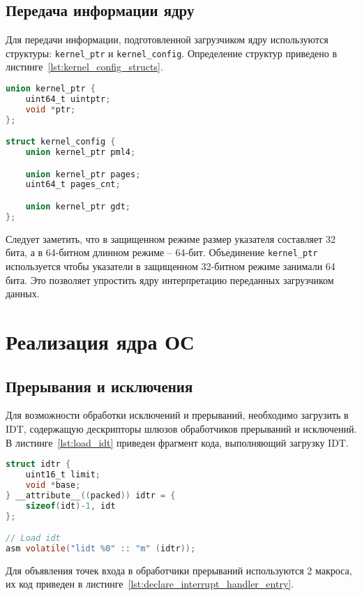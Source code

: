 \subsection{Передача информации ядру}
Для передачи информации, подготовленной загрузчиком ядру используются структуры:
\texttt{kernel\_ptr} и \texttt{kernel\_config}. Определение структур приведено
в листинге~\ref{lst:kernel_config_structs}.

\begin{lstlisting}[language=C,
caption={Структуры для передачи информации ядру},
label={lst:kernel_config_structs}]
union kernel_ptr {
	uint64_t uintptr;
	void *ptr;
};

struct kernel_config {
	union kernel_ptr pml4;

	union kernel_ptr pages;
	uint64_t pages_cnt;

	union kernel_ptr gdt;
};
\end{lstlisting}

Следует заметить, что в защищенном режиме размер указателя составляет 32 бита, а
в 64-битном длинном режиме -- 64-бит. Объединение \texttt{kernel\_ptr} используется
чтобы указатели в защищенном 32-битном режиме занимали 64 бита. Это позволяет
упростить ядру интерпретацию переданных загрузчиком данных.

\section{Реализация ядра ОС}
\subsection{Прерывания и исключения}
Для возможности обработки исключений и прерываний, необходимо загрузить в IDT, содержащую
дескрипторы шлюзов обработчиков прерываний и исключений. В листинге~\ref{lst:load_idt}
приведен фрагмент кода, выполняющий загрузку IDT.

\begin{lstlisting}[language=C,
caption={Загрузка IDT},
label={lst:load_idt}]
struct idtr {
	uint16_t limit;
	void *base;
} __attribute__((packed)) idtr = {
	sizeof(idt)-1, idt
};

// Load idt
asm volatile("lidt %0" :: "m" (idtr));
\end{lstlisting}

Для объявления точек входа в обработчики прерываний используются 2 макроса, их
код приведен в листинге~\ref{lst:declare_interrupt_handler_entry}.

